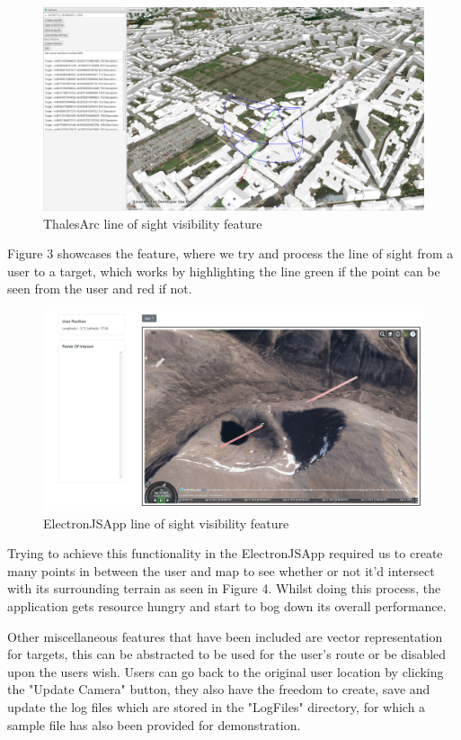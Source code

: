 \documentclass{l3proj}
\begin{document}
\begin{figure}[H]
    \caption{ThalesArc line of sight visibility feature}
    \centering
    \includegraphics[width=\textwidth]{ArcGISLOS.jpg}
\end{figure}

Figure 3 showcases the feature, where we try and process the line of sight from a user to a target, which works by highlighting the line green if the point can be seen from the user and red if not.

\begin{figure}[H]
    \caption{ElectronJSApp line of sight visibility feature}
    \includegraphics[width=\textwidth]{ElectronJSLOS.jpg}
\end{figure}

Trying to achieve this functionality in the ElectronJSApp required us to create many points in between the user and map to see whether or not it'd intersect with its surrounding terrain as seen in Figure 4. Whilst doing this process, the application gets resource hungry and start to bog down its overall performance. 

Other miscellaneous features that have been included are vector representation for targets, this can be abstracted to be used for the user's route or be disabled upon the users wish. Users can go back to the original user location by clicking the "Update Camera" button, they also have the freedom to create, save and update the log files which are stored in the "LogFiles" directory, for which a sample file has also been provided for demonstration.
\end{document}
